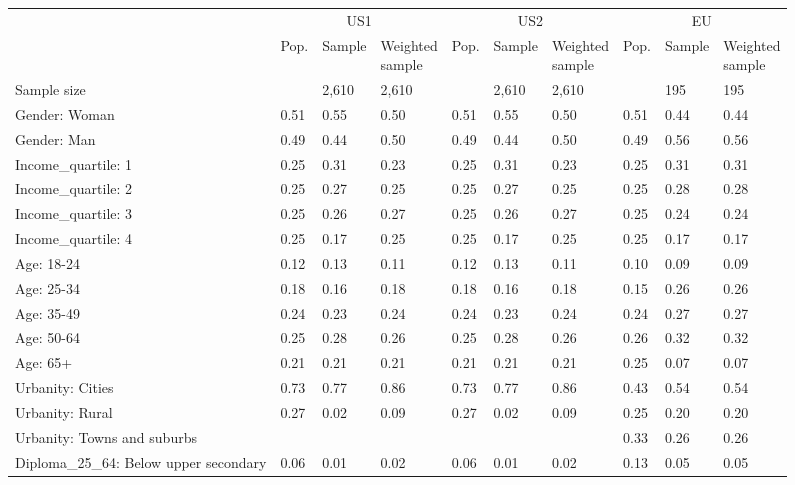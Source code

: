
\begin{tabular}[t]{llllllllll}
\toprule
\multicolumn{1}{c}{} & \multicolumn{3}{c}{US1} & \multicolumn{3}{c}{US2} & \multicolumn{3}{c}{EU} \\
\cmidrule(l{3pt}r{3pt}){2-4} \cmidrule(l{3pt}r{3pt}){5-7} \cmidrule(l{3pt}r{3pt}){8-10}
  & Pop. & Sample & \makecell{Weighted\\sample} & Pop. & Sample & \makecell{Weighted\\sample} & Pop. & Sample & \makecell{Weighted\\sample}\\
\midrule
Sample size &  & 2,610 & 2,610 &  & 2,610 & 2,610 &  & 195 & 195\\
\addlinespace
Gender: Woman & 0.51 & 0.55 & 0.50 & 0.51 & 0.55 & 0.50 & 0.51 & 0.44 & 0.44\\
Gender: Man & 0.49 & 0.44 & 0.50 & 0.49 & 0.44 & 0.50 & 0.49 & 0.56 & 0.56\\
\addlinespace
Income\_quartile: 1 & 0.25 & 0.31 & 0.23 & 0.25 & 0.31 & 0.23 & 0.25 & 0.31 & 0.31\\
Income\_quartile: 2 & 0.25 & 0.27 & 0.25 & 0.25 & 0.27 & 0.25 & 0.25 & 0.28 & 0.28\\
Income\_quartile: 3 & 0.25 & 0.26 & 0.27 & 0.25 & 0.26 & 0.27 & 0.25 & 0.24 & 0.24\\
Income\_quartile: 4 & 0.25 & 0.17 & 0.25 & 0.25 & 0.17 & 0.25 & 0.25 & 0.17 & 0.17\\
\addlinespace
Age: 18-24 & 0.12 & 0.13 & 0.11 & 0.12 & 0.13 & 0.11 & 0.10 & 0.09 & 0.09\\
Age: 25-34 & 0.18 & 0.16 & 0.18 & 0.18 & 0.16 & 0.18 & 0.15 & 0.26 & 0.26\\
Age: 35-49 & 0.24 & 0.23 & 0.24 & 0.24 & 0.23 & 0.24 & 0.24 & 0.27 & 0.27\\
Age: 50-64 & 0.25 & 0.28 & 0.26 & 0.25 & 0.28 & 0.26 & 0.26 & 0.32 & 0.32\\
Age: 65+ & 0.21 & 0.21 & 0.21 & 0.21 & 0.21 & 0.21 & 0.25 & 0.07 & 0.07\\
\addlinespace
Urbanity: Cities & 0.73 & 0.77 & 0.86 & 0.73 & 0.77 & 0.86 & 0.43 & 0.54 & 0.54\\
Urbanity: Rural & 0.27 & 0.02 & 0.09 & 0.27 & 0.02 & 0.09 & 0.25 & 0.20 & 0.20\\
Urbanity: Towns and suburbs &  &  &  &  &  &  & 0.33 & 0.26 & 0.26\\
\addlinespace
Diploma\_25\_64: Below upper secondary & 0.06 & 0.01 & 0.02 & 0.06 & 0.01 & 0.02 & 0.13 & 0.05 & 0.05\\

\end{tabular}
